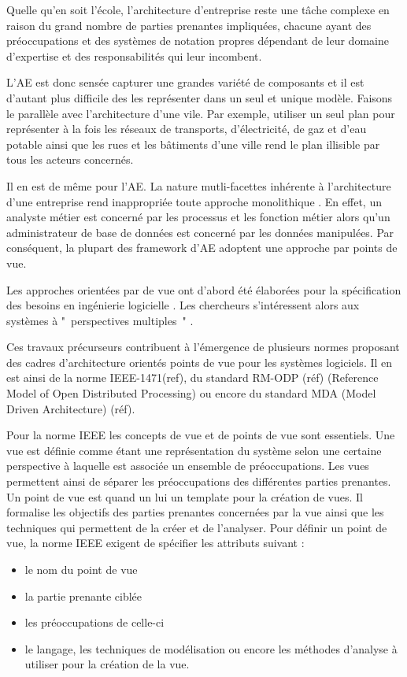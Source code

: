 Quelle qu'en soit l'école, l'architecture d'entreprise reste une tâche complexe 
\cite{steen2004supporting} en raison du grand nombre de parties prenantes 
impliquées, chacune ayant des préoccupations et des systèmes de notation propres 
dépendant de leur domaine d'expertise et des responsabilités qui leur incombent.

L'AE est donc sensée capturer une grandes variété de composants et il est 
d'autant plus difficile des les représenter dans un seul et unique modèle. 
Faisons le parallèle avec l'architecture d'une vile. Par exemple, utiliser un 
seul plan pour représenter à la fois les réseaux de transports, d'électricité, 
de gaz et d'eau potable ainsi que les rues et les bâtiments d'une ville rend le 
plan illisible par tous les acteurs concernés.

Il en est de même pour l'AE. La nature mutli-facettes inhérente à l'architecture 
d'une entreprise rend inappropriée toute approche monolithique 
\cite{armour1999bigpicture}. En effet, un analyste métier est concerné par les 
processus et les fonction métier alors qu'un administrateur de base de données 
est concerné par les données manipulées. Par conséquent, la plupart des 
framework d'AE adoptent une approche par points de vue.

Les approches orientées par de vue ont d'abord été élaborées pour la 
spécification des besoins en ingénierie logicielle \cite{mullery1979core}. Les 
chercheurs s'intéressent alors aux systèmes à "~perspectives multiples~" 
\cite{finkelstein1992viewpoints} \cite{kotonya1996requirements} 
\cite{nuseibeh1994multi} \cite{meyers1993representing}. 

Ces travaux précurseurs contribuent à l'émergence de plusieurs normes proposant 
des cadres d'architecture orientés points de vue pour les systèmes logiciels. Il 
en est ainsi de la norme IEEE-1471(ref), du standard RM-ODP (réf) (Reference 
Model of Open Distributed Processing) ou encore du standard MDA (Model Driven 
Architecture) (réf).

Pour la norme IEEE les concepts de vue et de points de vue sont essentiels. 
Une vue est définie comme étant une représentation du système selon une certaine 
perspective à laquelle est associée un ensemble de préoccupations. Les vues 
permettent ainsi de séparer les préoccupations des différentes parties 
prenantes. Un point de vue est quand un lui un template pour la création de 
vues. Il formalise les objectifs des parties prenantes concernées par la vue 
ainsi que les techniques qui permettent de la créer et de l'analyser. Pour 
définir un point de vue, la norme IEEE exigent de spécifier les attributs 
suivant :
\begin{itemize}
\item le nom du point de vue
\item la partie prenante ciblée
\item les préoccupations de celle-ci
\item le langage, les techniques de modélisation ou encore les méthodes 
d'analyse à utiliser pour la création de la vue. 
\end{itemize}


